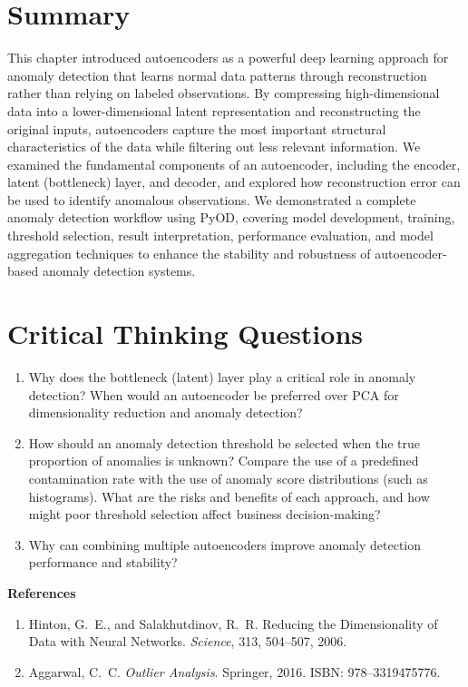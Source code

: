 \section{Summary}

This chapter introduced autoencoders as a powerful deep learning approach for anomaly detection that learns normal data patterns through reconstruction rather than relying on labeled observations. By compressing high-dimensional data into a lower-dimensional latent representation and reconstructing the original inputs, autoencoders capture the most important structural characteristics of the data while filtering out less relevant information. We examined the fundamental components of an autoencoder, including the encoder, latent (bottleneck) layer, and decoder, and explored how reconstruction error can be used to identify anomalous observations. We demonstrated a complete anomaly detection workflow using PyOD, covering model development, training, threshold selection, result interpretation, performance evaluation, and model aggregation techniques to enhance the stability and robustness of autoencoder-based anomaly detection systems.

\section{Critical Thinking Questions}

\begin{enumerate}
\item Why does the bottleneck (latent) layer play a critical role in anomaly detection?
When would an autoencoder be preferred over PCA for dimensionality reduction and anomaly detection?
\item How should an anomaly detection threshold be selected when the true proportion of anomalies is unknown? Compare the use of a predefined contamination rate with the use of anomaly score distributions (such as histograms). What are the risks and benefits of each approach, and how might poor threshold selection affect business decision-making?
\item Why can combining multiple autoencoders improve anomaly detection performance and stability?

\end{enumerate}


\vspace{0.5cm}
\noindent \large{\textbf{References}}
\normalsize

\begin{enumerate}

\item
Hinton, G.~E.,
and Salakhutdinov, R.~R.
\newblock Reducing the Dimensionality of Data with Neural Networks.
\newblock \emph{Science},
313, 504--507, 2006.

\item
Aggarwal, C.~C.
\newblock \emph{Outlier Analysis}.
\newblock Springer, 2016.
\newblock ISBN: 978--3319475776.

\end{enumerate}



